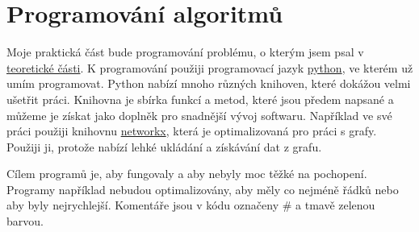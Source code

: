 \chapter{Programování algoritmů}
\label{chap:programovani}

Moje praktická část bude programování problému, o kterým jsem psal v \hyperref[part:teoreticka-cast]{teoretické části}. K programování použiji programovací jazyk \href{https://www.python.org/}{python}, ve kterém už umím programovat. Python nabízí mnoho různých knihoven, které dokážou velmi ušetřit práci. Knihovna je sbírka funkcí a metod, které jsou předem napsané a můžeme je získat jako doplněk pro snadnější vývoj softwaru. Například ve své práci použiji knihovnu \href{https://networkx.org/}{networkx}, která je optimalizovaná pro práci s grafy. Použiji ji, protože nabízí lehké ukládání a získávání dat z grafu.

Cílem programů je, aby fungovaly a aby nebyly moc těžké na pochopení. Programy například nebudou optimalizovány, aby měly co nejméně řádků nebo aby byly nejrychlejší. Komentáře jsou v kódu označeny \textcolor{commentgreen}{\#} a \textcolor{commentgreen}{tmavě zelenou barvou}.

% 


